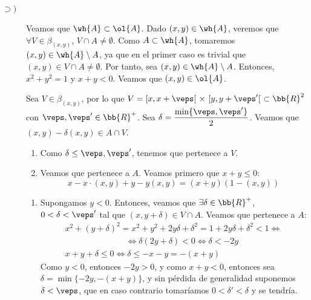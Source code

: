 \documentclass[12pt]{article}
\begin{document}
\begin{ejercicio}
\begin{enumerate}
\begin{description}
                \item[$\supset)$] Veamos que $\wh{A}\subset \ol{A}$. Dado $(x,y)\in \wh{A}$, veremos que $\forall V\in \beta_{(x,y)}$, $V\cap A\neq \emptyset$.
                Como $A\subset \wh{A}$, tomaremos $(x,y)\in \wh{A}\setminus A$, ya que en el primer caso es trivial que $(x,y)\in V\cap A\neq \emptyset$.
                Por tanto, sea $(x,y)\in \wh{A}\setminus A$. Entonces, $x^2+y^2=1$ y $x+y<0$. Veamos que $(x,y)\in \ol{A}$.

                Sea $V\in \beta_{(x,y)}$, por lo que $V=[x,x+\veps[~\times~[y,y+\veps'[~\subset \bb{R}^2$ con $\veps,\veps'\in \bb{R}^+$.
                Sea $\delta=\dfrac{\min\{\veps, \veps'\}}{2}$.
                Veamos que $(x,y)-\delta(x,y)\in A\cap V$.
                \begin{enumerate}
                    \item Como $\delta \leq \veps,\veps'$, tenemos que pertenece a $V$.
                    \item Veamos que pertenece a $A$. Veamos primero que $x+y\leq 0$:
                    \begin{equation*}
                        x-x\cdot (x,y)+ y -y (x,y)= (x+y)\left(1-(x,y)\right)
                    \end{equation*}
                \end{enumerate}

                \begin{enumerate}
                    \item Supongamos $y<0$. Entonces, veamos que $\exists \delta \in \bb{R}^+$, $0<\delta<\veps'$ tal que $\left(x, y+\delta\right)\in V\cap A$.
                    Veamos que pertenece a $A$:
                    \begin{gather*}
                        x^2 + \left(y+\delta\right)^2 = x^2 + y^2 + 2y\delta + \delta^2 = 1 + 2y\delta + \delta^2 < 1 \Longleftrightarrow \\
                        \hspace{3cm}\Longleftrightarrow \delta(2y+\delta) < 0 \Longleftrightarrow \delta < -2y \\
                        x + y + \delta \leq 0 \Longleftrightarrow \delta \leq -x-y = -(x+y)
                    \end{gather*}
                    Como $y<0$, entonces $-2y>0$, y como $x+y<0$, entonces sea $\delta=\min\{-2y, -(x+y)\}$, y sin pérdida de generalidad suponemos $\delta < \veps$, que en caso contrario tomaríamos $0<\delta'<\delta$ y se tendría.


\end{enumerate}
\end{description}
\end{enumerate}
\end{ejercicio}
\end{document}
